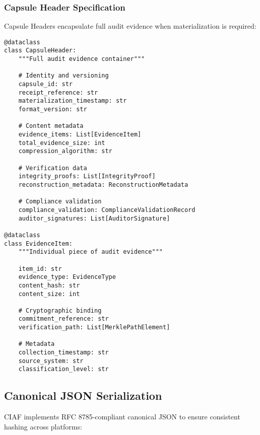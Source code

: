 \documentclass[12pt,a4paper]{article}
\begin{document}
\subsubsection{Capsule Header Specification}

Capsule Headers encapsulate full audit evidence when materialization is required:

\begin{lstlisting}[caption=Capsule Header Data Structure]
@dataclass  
class CapsuleHeader:
    """Full audit evidence container"""
    
    # Identity and versioning
    capsule_id: str
    receipt_reference: str
    materialization_timestamp: str
    format_version: str
    
    # Content metadata
    evidence_items: List[EvidenceItem]
    total_evidence_size: int
    compression_algorithm: str
    
    # Verification data
    integrity_proofs: List[IntegrityProof]
    reconstruction_metadata: ReconstructionMetadata
    
    # Compliance validation
    compliance_validation: ComplianceValidationRecord
    auditor_signatures: List[AuditorSignature]
    
@dataclass
class EvidenceItem:
    """Individual piece of audit evidence"""
    
    item_id: str
    evidence_type: EvidenceType
    content_hash: str
    content_size: int
    
    # Cryptographic binding
    commitment_reference: str
    verification_path: List[MerklePathElement]
    
    # Metadata
    collection_timestamp: str
    source_system: str
    classification_level: str
\end{lstlisting}

\subsection{Canonical JSON Serialization}

CIAF implements RFC 8785-compliant canonical JSON to ensure consistent hashing across platforms:
\end{document}
